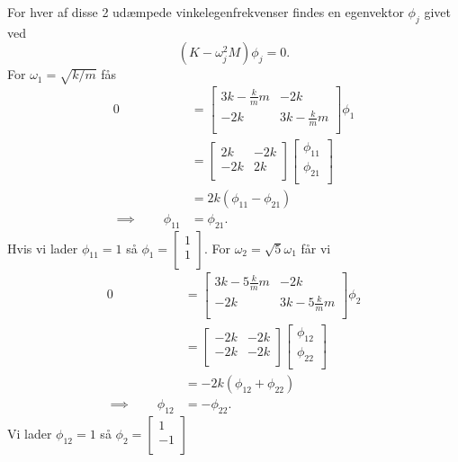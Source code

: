 \begin{derivation}
  For hver af disse 2 udæmpede vinkelegenfrekvenser findes en egenvektor $\phi_j$ givet ved
  \[ 
  \left( K - \omega_j^2 M \right) \phi_j = 0
  .\]
  For $\omega_1 = \sqrt{k / m}$ fås
  \begin{align*}
    0 &= \begin{bmatrix}
    3k - \frac{k}{m}m & - 2k\\
    -2k & 3k - \frac{k}{m}m\\
    \end{bmatrix} \phi_1 \\
      &= \begin{bmatrix}
    2k & -2k\\
    -2k & 2k\\
    \end{bmatrix} \begin{bmatrix}
    \phi_{11}\\
    \phi_{21}\\
    \end{bmatrix} \\
      &= 2k \left( \phi_{11}- \phi_{21} \right) \\
      \implies \qquad \phi_{11} &= \phi_{21}
  .\end{align*}
  Hvis vi lader $\phi_{11} = 1$ så $\phi_1 = \begin{bmatrix}
  1\\
  1\\
  \end{bmatrix}$.
  For $\omega_2 = \sqrt{5}\omega_1$ får vi
  \begin{align*}
    0 &= \begin{bmatrix}
    3k - 5 \frac{k}{m}m & - 2k\\
    -2k & 3k - 5 \frac{k}{m}m\\
    \end{bmatrix}\phi_2  \\
      &= \begin{bmatrix}
    -2k & -2k\\
    -2k & -2k\\
    \end{bmatrix} \begin{bmatrix}
    \phi_{12}\\
    \phi_{22}\\
    \end{bmatrix} \\
      &= - 2k \left( \phi_{12} + \phi_{22} \right) \\
      \implies \qquad \phi_{12} &= - \phi_{22}
  .\end{align*}
  Vi lader $\phi_{12} = 1$ så $\phi_2 = \begin{bmatrix}
  1\\
  -1\\
  \end{bmatrix}$
\end{derivation}

